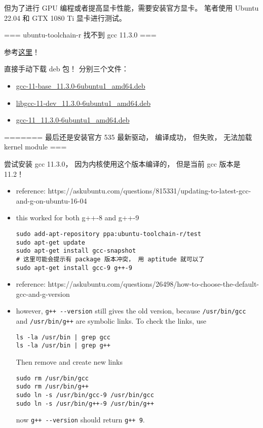 
 但为了进行 GPU 编程或者提高显卡性能，需要安装官方显卡。 笔者使用 Ubuntu 22.04 和 GTX 1080 Ti 显卡进行测试。

=== ubuntu-toolchain-r 找不到 gcc 11.3.0 ===

参考\href{https://askubuntu.com/questions/1481354/install-a-specific-gcc-version-to-match-the-version-the-kernel-was-compiled-with}{这里}！

直接手动下载 deb 包！ 分别三个文件：
\begin{itemize}
\item \href{http://mirrors.kernel.org/ubuntu/pool/main/g/gcc-11/gcc-11-base_11.3.0-6ubuntu1_amd64.deb}{gcc-11-base_11.3.0-6ubuntu1_amd64.deb}
\item \href{http://mirrors.kernel.org/ubuntu/pool/main/g/gcc-11/libgcc-11-dev_11.3.0-6ubuntu1_amd64.deb}{libgcc-11-dev_11.3.0-6ubuntu1_amd64.deb}
\item \href{http://mirrors.kernel.org/ubuntu/pool/universe/g/gcc-11/gcc-11_11.3.0-6ubuntu1_amd64.deb}{gcc-11_11.3.0-6ubuntu1_amd64.deb}
\end{itemize}


======= 最后还是安装官方 535 最新驱动， 编译成功， 但失败， 无法加载 kernel module ===

尝试安装 gcc 11.3.0， 因为内核使用这个版本编译的， 但是当前 gcc 版本是 11.2！

\begin{itemize}
\item reference: https://askubuntu.com/questions/815331/updating-to-latest-gcc-and-g-on-ubuntu-16-04
\item this worked for both g++-8 and g++-9
\begin{lstlisting}[language=none]
sudo add-apt-repository ppa:ubuntu-toolchain-r/test
sudo apt-get update
sudo apt-get install gcc-snapshot
# 这里可能会提示有 package 版本冲突， 用 aptitude 就可以了
sudo apt-get install gcc-9 g++-9
\end{lstlisting}
\item reference: https://askubuntu.com/questions/26498/how-to-choose-the-default-gcc-and-g-version
\item however, \verb`g++ --version` still gives the old version, because \verb`/usr/bin/gcc` and \verb`/usr/bin/g++` are symbolic links. To check the links, use
\begin{lstlisting}[language=none]
ls -la /usr/bin | grep gcc
ls -la /usr/bin | grep g++
\end{lstlisting}
Then remove and create new links
\begin{lstlisting}[language=none]
sudo rm /usr/bin/gcc
sudo rm /usr/bin/g++
sudo ln -s /usr/bin/gcc-9 /usr/bin/gcc
sudo ln -s /usr/bin/g++-9 /usr/bin/g++
\end{lstlisting}
now \verb`g++ --version` should return \verb`g++ 9`.
\end{itemize}



